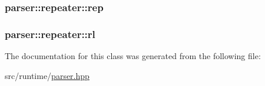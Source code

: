 \subsubsection[{\texorpdfstring{rep}{rep}}]{ parser\+::repeater\+::rep\hspace{0.3cm}{\ttfamily [private]}}\hypertarget{classparser_1_1repeater_ad76ca9d514283b1fa25e20d01b110104}{}\label{classparser_1_1repeater_ad76ca9d514283b1fa25e20d01b110104}
\subsubsection[{\texorpdfstring{rl}{rl}}]{ parser\+::repeater\+::rl\hspace{0.3cm}{\ttfamily [private]}}\hypertarget{classparser_1_1repeater_a1969288aaeb1b6957586356bf2986194}{}\label{classparser_1_1repeater_a1969288aaeb1b6957586356bf2986194}


The documentation for this class was generated from the following file\+:\begin{DoxyCompactItemize}
\item 
src/runtime/\hyperlink{parser_8hpp}{parser.\+hpp}\end{DoxyCompactItemize}
